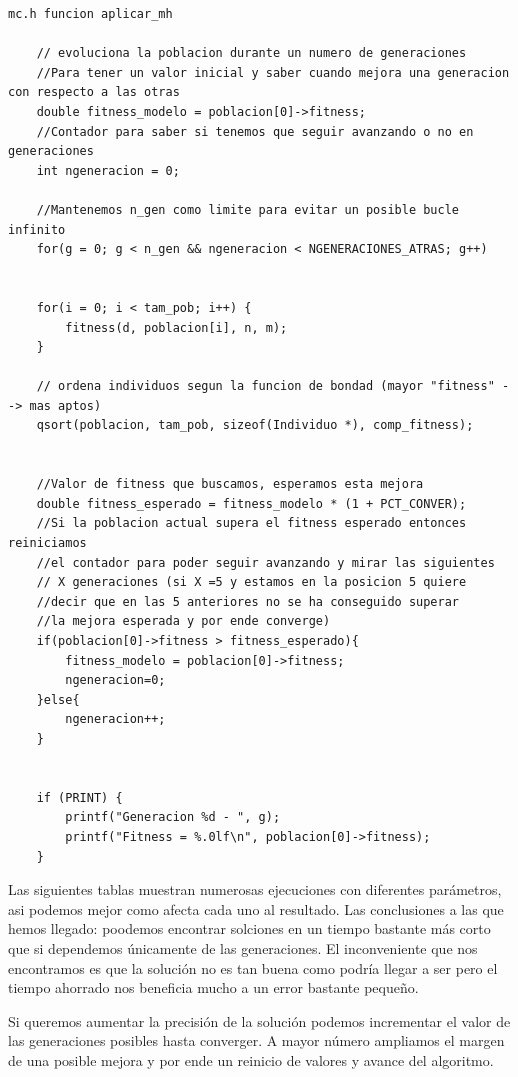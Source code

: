 \documentclass[12pt]{article}
\begin{document}
\begin{enumerate}
\begin{lstlisting}[style=EstiloC]
    mc.h funcion aplicar_mh 

    // evoluciona la poblacion durante un numero de generaciones
	//Para tener un valor inicial y saber cuando mejora una generacion con respecto a las otras
	double fitness_modelo = poblacion[0]->fitness;
	//Contador para saber si tenemos que seguir avanzando o no en generaciones
	int ngeneracion = 0;

	//Mantenemos n_gen como limite para evitar un posible bucle infinito
	for(g = 0; g < n_gen && ngeneracion < NGENERACIONES_ATRAS; g++)


    for(i = 0; i < tam_pob; i++) {
        fitness(d, poblacion[i], n, m);
    }
    
    // ordena individuos segun la funcion de bondad (mayor "fitness" --> mas aptos)
    qsort(poblacion, tam_pob, sizeof(Individuo *), comp_fitness);
    

    //Valor de fitness que buscamos, esperamos esta mejora
    double fitness_esperado = fitness_modelo * (1 + PCT_CONVER);
    //Si la poblacion actual supera el fitness esperado entonces reiniciamos 
    //el contador para poder seguir avanzando y mirar las siguientes 
    // X generaciones (si X =5 y estamos en la posicion 5 quiere 
    //decir que en las 5 anteriores no se ha conseguido superar 
    //la mejora esperada y por ende converge)
    if(poblacion[0]->fitness > fitness_esperado){
        fitness_modelo = poblacion[0]->fitness;
        ngeneracion=0;
    }else{
        ngeneracion++;
    }		


    if (PRINT) {
        printf("Generacion %d - ", g);
        printf("Fitness = %.0lf\n", poblacion[0]->fitness);
    }

\end{lstlisting}


Las siguientes tablas muestran numerosas ejecuciones con diferentes parámetros, asi podemos mejor como afecta cada uno al resultado.
Las conclusiones a las que hemos llegado: poodemos encontrar solciones en un tiempo bastante más corto que si dependemos únicamente de las generaciones. El 
inconveniente que nos encontramos es que la solución no es tan buena como podría llegar a ser pero el tiempo ahorrado nos beneficia mucho a un error bastante pequeño. 

Si queremos aumentar la precisión de la solución podemos incrementar el valor de las generaciones posibles hasta converger. A mayor número ampliamos el margen de una posible mejora 
y por ende un reinicio de valores y avance del algoritmo. 


\end{enumerate}
\end{document}
